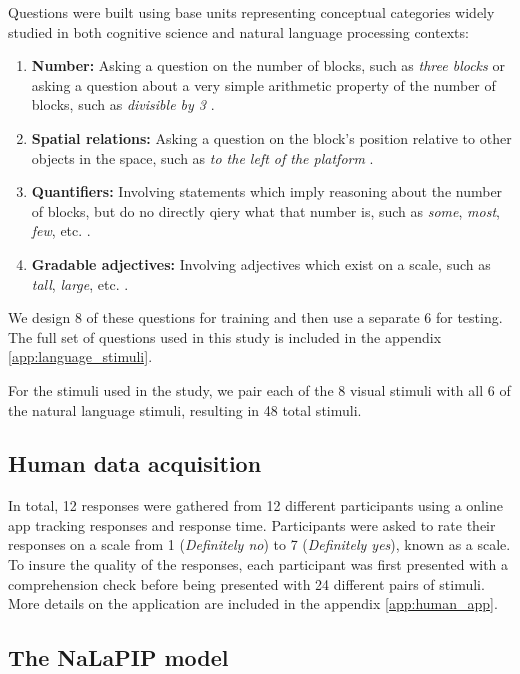 \documentclass[10pt,letterpaper]{article}
\begin{document}
Questions were built using base units representing conceptual categories widely studied in both cognitive science and natural language processing contexts:
\begin{enumerate}
    \item \textbf{Number:} Asking a question on the number of blocks, such as \textit{three blocks} or asking a question about a very simple arithmetic property of the number of blocks, such as \textit{divisible by 3} \cite{bartsch1973semantics,gelman1978thechild}.
    \item \textbf{Spatial relations:} Asking a question on the block's position relative to other objects in the space, such as \textit{to the left of the platform} \cite{landau1993whence}. 
    \item \textbf{Quantifiers:} Involving statements which imply reasoning about the number of blocks, but do no directly qiery what that number is, such as \textit{some}, \textit{most}, \textit{few}, etc. \cite{montague1973proper,van2021probabilistic, barwise1981generalized}.
    \item \textbf{Gradable adjectives:} Involving adjectives which exist on a scale, such as \textit{tall}, \textit{large}, etc. \cite{klein1980semantics,lassiter2017adjectival}. 
\end{enumerate}
We design 8 of these questions for training and then use a separate 6 for testing. The full set of questions used in this study is included in the appendix \autoref{app:language_stimuli}. 

For the stimuli used in the study, we pair each of the 8 visual stimuli with all 6 of the natural language stimuli, resulting in 48 total stimuli.

\subsection{Human data acquisition} 

In total, 12 responses were gathered from 12 different participants using a online app tracking responses and response time. Participants were asked to rate their responses on a scale from 1 (\textit{Definitely no}) to 7 (\textit{Definitely yes}), known as a  scale. To insure the quality of the responses, each participant was first presented with a comprehension check before being presented with 24 different pairs of stimuli. More details on the application are included in the appendix \autoref{app:human_app}.

\subsection{The NaLaPIP model}
\end{document}
